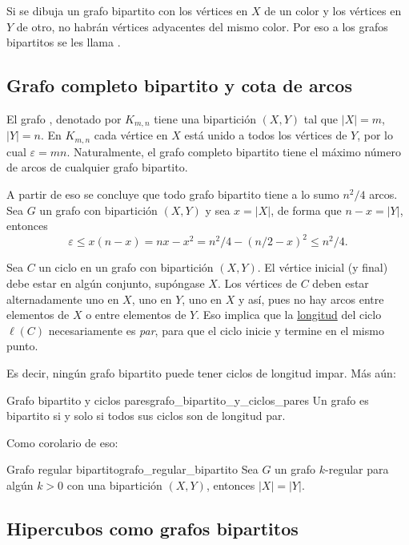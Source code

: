 Si se dibuja un grafo bipartito con los vértices en \(X\) de un color y los vértices en \(Y\) de otro, no habrán vértices adyacentes del mismo color. Por eso a los grafos bipartitos se les llama .

\subsection{Grafo completo bipartito y cota de arcos}

El grafo , denotado por \(K_{m, n}\) tiene una bipartición \((X, Y)\) tal que \(|X|=m\), \(|Y|=n\). En \(K_{m,n}\) cada vértice en \(X\) está unido a todos los vértices de \(Y\), por lo cual \(\varepsilon = mn\). Naturalmente, el grafo completo bipartito tiene el máximo número de arcos de cualquier grafo bipartito.

A partir de eso se concluye que todo grafo bipartito tiene a lo sumo \(n^2/4\) arcos. Sea \(G\) un grafo con bipartición \((X, Y)\) y sea \(x=|X|\), de forma que \(n-x=|Y|\), entonces \[
\varepsilon \leq x(n-x) = nx-x^2 = n^2/4 - (n/2-x)^2 \leq n^2/4.
\] 

Sea \(C\) un ciclo en un grafo con bipartición \((X,Y)\). El vértice inicial (y final) debe estar en algún conjunto, supóngase \(X\). Los vértices de \(C\) deben estar alternadamente uno en \(X\), uno en \(Y\), uno en \(X\) y así, pues no hay arcos entre elementos de \(X\) o entre elementos de \(Y\). Eso implica que la \hyperref[sec:longitud_de_un_camino]{longitud} del ciclo \(\ell(C)\) necesariamente es \emph{par}, para que el ciclo inicie y termine en el mismo punto.

Es decir, ningún grafo bipartito puede tener ciclos de longitud impar. Más aún:
\begin{teorema}{Grafo bipartito y ciclos pares}{grafo_bipartito_y_ciclos_pares}
  Un grafo es bipartito si y solo si todos sus ciclos son de longitud par.
\end{teorema}

Como corolario de eso:  %
\begin{corolario}{Grafo regular bipartito}{grafo_regular_bipartito}
  Sea \(G\) un grafo \(k\)-regular para algún \(k>0\) con una bipartición \((X, Y)\), entonces \(|X|=|Y|\).
\end{corolario}

\subsection{Hipercubos como grafos bipartitos}
\label{sec:hipercubos_como_grafos_bipartitos}

